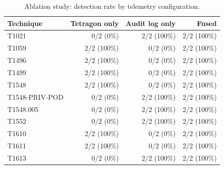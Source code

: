 \begin{table}[t]
\centering
\caption{Ablation study: detection rate by telemetry configuration.}
\label{tab:ablation}
\begin{tabular}{lrrr}
\toprule
Technique & Tetragon only & Audit log only & Fused \\
\midrule
T1021 & 0/2 (0\%) & 2/2 (100\%) & 2/2 (100\%) \\
T1059 & 2/2 (100\%) & 0/2 (0\%) & 2/2 (100\%) \\
T1496 & 2/2 (100\%) & 0/2 (0\%) & 2/2 (100\%) \\
T1499 & 2/2 (100\%) & 0/2 (0\%) & 2/2 (100\%) \\
T1548 & 2/2 (100\%) & 0/2 (0\%) & 2/2 (100\%) \\
T1548-PRIV-POD & 0/2 (0\%) & 2/2 (100\%) & 2/2 (100\%) \\
T1548.005 & 0/2 (0\%) & 2/2 (100\%) & 2/2 (100\%) \\
T1552 & 0/2 (0\%) & 2/2 (100\%) & 2/2 (100\%) \\
T1610 & 2/2 (100\%) & 0/2 (0\%) & 2/2 (100\%) \\
T1611 & 2/2 (100\%) & 0/2 (0\%) & 2/2 (100\%) \\
T1613 & 0/2 (0\%) & 2/2 (100\%) & 2/2 (100\%) \\
\bottomrule
\end{tabular}
\end{table}

